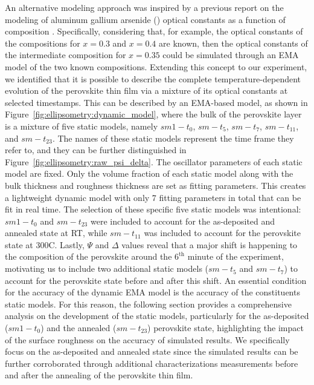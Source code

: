 An alternative modeling approach was inspired by a previous report on the modeling of aluminum gallium arsenide () optical constants as a function of composition \cite{Snyder1990ModelingComposition}. Specifically, considering that, for example, the optical constants of the compositions for $x=0.3$ and $x=0.4$ are known, then the optical constants of the intermediate composition for $x=0.35$ could be simulated through an EMA model of the two known compositions. Extending this concept to our experiment, we identified that it is possible to describe the complete temperature-dependent evolution of the perovskite thin film via a mixture of its optical constants at selected timestamps. This can be described by an EMA-based model, as shown in Figure~\ref{fig:ellipsometry:dynamic_model}, where the bulk of the perovskite layer is a mixture of five static models, namely $sm1-t_0$, $sm-t_5$, $sm-t_7$, $sm-t_{\text{11}}$, and $sm-t_{\text{23}}$. The names of these static models represent the time frame they refer to, and they can be further distinguished in Figure~\ref{fig:ellipsometry:raw_psi_delta}. The oscillator parameters of each static model are fixed. Only the volume fraction of each static model along with the bulk thickness and roughness thickness are set as fitting parameters. This creates a lightweight dynamic model with only 7 fitting parameters in total that can be fit in real time. The selection of these specific five static models was intentional: $sm1-t_0$ and $sm-t_{\text{23}}$ were included to account for the as-deposited and annealed state at RT, while $sm-t_{\text{11}}$ was included to account for the perovskite state at 300\degree C. Lastly, $\Psi$ and $\Delta$ values reveal that a major shift is happening to the composition of the perovskite around the $6^{\text{th}}$ minute of the experiment, motivating us to include two additional static models ($sm-t_5$ and $sm-t_7$) to account for the perovskite state before and after this shift. An essential condition for the accuracy of the dynamic EMA model is the accuracy of the constituents static models. For this reason, the following section provides a comprehensive analysis on the development of the static models, particularly for the as-deposited ($sm1-t_0$) and the annealed ($sm-t_{\text{23}}$) perovskite state, highlighting the impact of the surface roughness on the accuracy of simulated results. We specifically focus on the as-deposited and annealed state since the simulated results can be further corroborated through additional characterizations measurements before and after the annealing of the perovskite thin film. 

